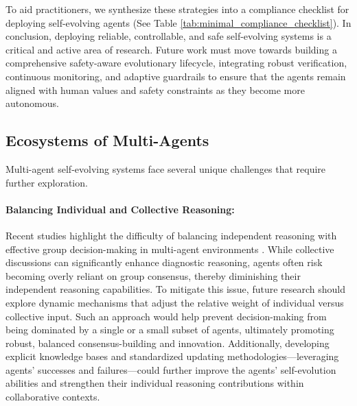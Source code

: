 To aid practitioners, we synthesize these strategies into a compliance checklist for deploying self-evolving agents (See Table \ref{tab:minimal_compliance_checklist}). In conclusion, deploying reliable, controllable, and safe self-evolving systems is a critical and active area of research. Future work must move towards building a comprehensive safety-aware evolutionary lifecycle, integrating robust verification, continuous monitoring, and adaptive guardrails to ensure that the agents remain aligned with human values and safety constraints as they become more autonomous.





\subsection{Ecosystems of Multi-Agents}
Multi-agent self-evolving systems face several unique challenges that require further exploration.
\paragraph{Balancing Individual and Collective Reasoning:} Recent studies highlight the difficulty of balancing independent reasoning with effective group decision-making in multi-agent environments \citep{chen2025mdteamgpt, sun2025collab}. While collective discussions can significantly enhance diagnostic reasoning, agents often risk becoming overly reliant on group consensus, thereby diminishing their independent reasoning capabilities. To mitigate this issue, future research should explore dynamic mechanisms that adjust the relative weight of individual versus collective input. Such an approach would help prevent decision-making from being dominated by a single or a small subset of agents, ultimately promoting robust, balanced consensus-building and innovation. Additionally, developing explicit knowledge bases and standardized updating methodologies—leveraging agents' successes and failures—could further improve the agents' self-evolution abilities and strengthen their individual reasoning contributions within collaborative contexts.

